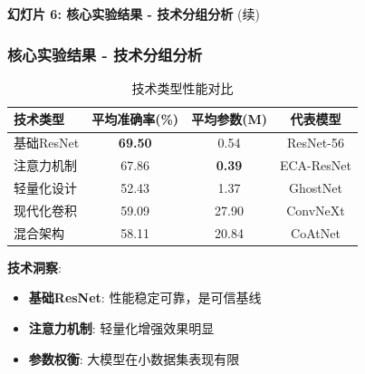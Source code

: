 \documentclass[10pt]{beamer}
\begin{document}
\begin{frame}{\textbf{幻灯片 6: 核心实验结果 - 技术分组分析} (续)}
\frametitle{核心实验结果 - 技术分组分析}

\hspace{-0.8cm}
\begin{center}
\begin{table}[h]
\small
\begin{tabular}{|l|c|c|c|}
\hline
技术类型 & 平均准确率(\%) & 平均参数(M) & 代表模型 \\
\hline
基础ResNet & \textbf{69.50} & 0.54 & ResNet-56 \\
注意力机制 & 67.86 & \textbf{0.39} & ECA-ResNet \\
轻量化设计 & 52.43 & 1.37 & GhostNet \\
现代化卷积 & 59.09 & 27.90 & ConvNeXt \\
混合架构 & 58.11 & 20.84 & CoAtNet \\
\hline
\end{tabular}
\caption{技术类型性能对比}
\end{table}
\end{center}

\vspace{0.8em}
{\small \textbf{技术洞察}:
\setlength{\itemsep}{0pt}
\setlength{\parsep}{0pt}
\setlength{\topsep}{0pt}
\begin{itemize}
    \item \textbf{基础ResNet}: 性能稳定可靠，是可信基线
    \item \textbf{注意力机制}: 轻量化增强效果明显  
    \item \textbf{参数权衡}: 大模型在小数据集表现有限
\end{itemize}}

\end{frame}
\end{document}

